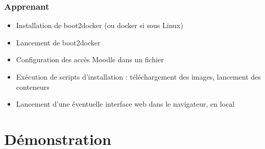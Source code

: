 \documentclass[10pt, compress]{beamer}
\begin{document}
\begin{frame}[fragile]
  \frametitle{Apprenant}

  \begin{itemize}[<+- | alert@+>]
      \item Installation de boot2docker (ou docker si sous Linux)
      \item Lancement de boot2docker
      \item Configuration des accès Moodle dans un fichier
      \item Exécution de scripts d'installation : téléchargement des images, lancement des conteneurs
      \item Lancement d'une éventuelle interface web dans le navigateur, en local
    \end{itemize}
\end{frame}


\section{Démonstration}

\end{document}
